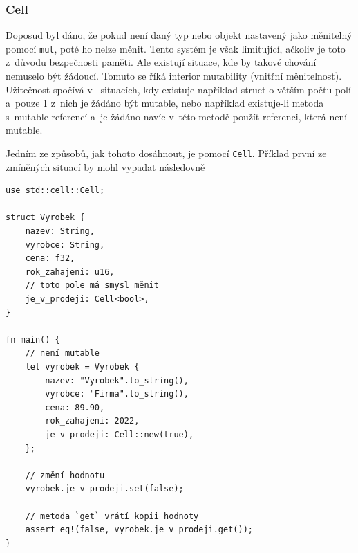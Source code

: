 \documentclass[a4paper, 12pt]{article} %
\newcommand{\rust}[1]{\texttt{#1}}
\begin{document}
        \subsubsection*{Cell}
            Doposud byl dáno, že pokud není daný typ nebo objekt nastavený jako měnitelný pomocí \rust{mut}, poté ho nelze měnit. Tento systém je však limitující, ačkoliv je toto z~důvodu bezpečnosti paměti. Ale existují situace, kde by takové chování nemuselo být žádoucí. Tomuto se říká interior mutability (vnitřní měnitelnost). Užitečnost spočívá v~ situacích, kdy existuje například struct o větším počtu polí a~pouze 1 z~nich je žádáno být mutable, nebo například existuje-li metoda s~mutable referencí a~je žádáno navíc v~této metodě použít referenci, která není mutable.
            
            Jedním ze způsobů, jak tohoto dosáhnout, je pomocí \rust{Cell}. Příklad první ze zmíněných situací by mohl vypadat následovně
            \begin{verbatim}
use std::cell::Cell;

struct Vyrobek {
    nazev: String,
    vyrobce: String,
    cena: f32,
    rok_zahajeni: u16,
    // toto pole má smysl měnit
    je_v_prodeji: Cell<bool>,
}

fn main() {
    // není mutable
    let vyrobek = Vyrobek {
        nazev: "Vyrobek".to_string(),
        vyrobce: "Firma".to_string(),
        cena: 89.90,
        rok_zahajeni: 2022,
        je_v_prodeji: Cell::new(true),
    };

    // změní hodnotu
    vyrobek.je_v_prodeji.set(false);

    // metoda `get` vrátí kopii hodnoty
    assert_eq!(false, vyrobek.je_v_prodeji.get());
}
            \end{verbatim}
            \cite{cell}
\end{document}
